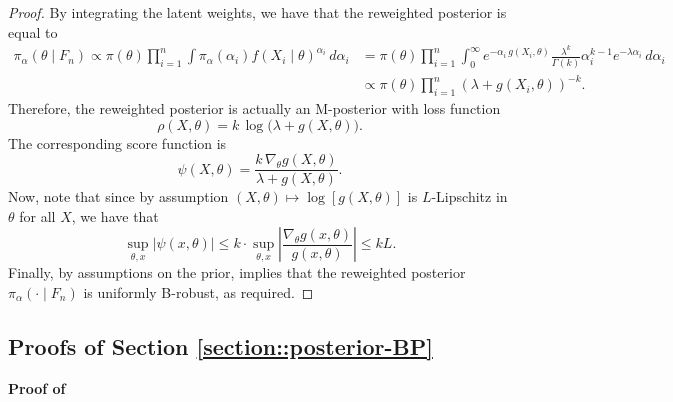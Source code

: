 \documentclass[11pt, oneside]{amsart}
\theoremstyle{definition}   %
\newcommand{\loss}{\rho}
\begin{document}
\begin{proof}
    By integrating the latent weights, we have that the reweighted posterior is equal to
    \begin{align*}
    \pi_\alpha(\theta\mid F_n) \propto \pi(\theta) \prod_{i=1}^n \int \pi_\alpha(\alpha_i) f(X_i \mid \theta)^{\alpha_i} \, d\alpha_i
  & = 
    \pi(\theta)\prod_{i=1}^n
    \int_0^\infty
    e^{-\alpha_i\,g(X_i,\theta)}
    \frac{\lambda^k}{\Gamma(k)}\alpha_i^{k-1}e^{-\lambda\alpha_i}
    \, d\alpha_i \\
    &\propto
    \pi(\theta)\prod_{i=1}^n(\lambda + g(X_i,\theta))^{-k}.
    \end{align*}
    Therefore, the reweighted posterior is actually an M-posterior with loss function
    \[
    \loss(X, \theta) = k \,\log \bigl(\lambda + g(X,\theta) \bigr).
    \]
    The corresponding score function is 
    \[
    \psi(X, \theta) = \frac{k \, \nabla_\theta g(X,\theta)}{\lambda + g(X, \theta)}.
    \]
    Now, note that since by assumption \( (X, \theta) \mapsto \log  [ g(X, \theta)  ]\) is \(L\)-Lipschitz in \( \theta\) for all \(X\), we have that
    \[
    \sup_{\theta, x} \left |\psi(x,\theta)\right|\leq k\cdot\sup_{\theta, x} \left | \frac{\nabla_\theta g(x, \theta)}{g(x, \theta)}  \right | \leq kL.
    \]
    Finally, by assumptions on the prior,  implies that the reweighted posterior \( \pi_\alpha(\cdot \mid F_n) \) is uniformly B-robust, as required.
\end{proof}

\subsection{Proofs of Section \ref{section::posterior-BP}}
%
\noindent \textbf{Proof of }
\end{document}
